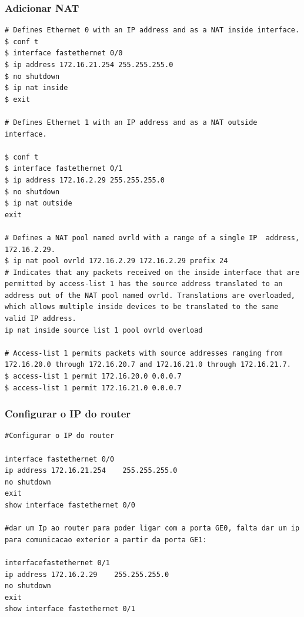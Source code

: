 \documentclass[11pt]{article}
\begin{document}
\bigskip

\subsubsection{Adicionar NAT}

\begin{lstlisting}[style=bashStyle]
# Defines Ethernet 0 with an IP address and as a NAT inside interface.
$ conf t            
$ interface fastethernet 0/0
$ ip address 172.16.21.254 255.255.255.0
$ no shutdown
$ ip nat inside        
$ exit
 
# Defines Ethernet 1 with an IP address and as a NAT outside interface.

$ conf t
$ interface fastethernet 0/1
$ ip address 172.16.2.29 255.255.255.0
$ no shutdown
$ ip nat outside       
exit
 
# Defines a NAT pool named ovrld with a range of a single IP  address, 172.16.2.29.
$ ip nat pool ovrld 172.16.2.29 172.16.2.29 prefix 24
# Indicates that any packets received on the inside interface that are permitted by access-list 1 has the source address translated to an address out of the NAT pool named ovrld. Translations are overloaded, which allows multiple inside devices to be translated to the same valid IP address.
ip nat inside source list 1 pool ovrld overload
 
# Access-list 1 permits packets with source addresses ranging from 172.16.20.0 through 172.16.20.7 and 172.16.21.0 through 172.16.21.7.
$ access-list 1 permit 172.16.20.0 0.0.0.7
$ access-list 1 permit 172.16.21.0 0.0.0.7

\end{lstlisting}

\bigskip

\subsubsection{Configurar o IP do router}

\begin{lstlisting}[style=bashStyle]
#Configurar o IP do router

interface fastethernet 0/0                 
ip address 172.16.21.254    255.255.255.0   
no shutdown
exit
show interface fastethernet 0/0

#dar um Ip ao router para poder ligar com a porta GE0, falta dar um ip para comunicacao exterior a partir da porta GE1:

interfacefastethernet 0/1                 
ip address 172.16.2.29    255.255.255.0      
no shutdown
exit
show interface fastethernet 0/1  
\end{lstlisting}
\end{document}
